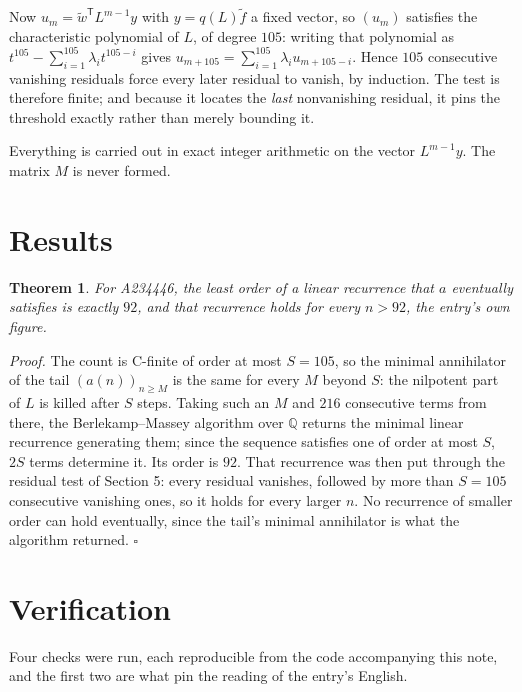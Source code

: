 \documentclass[11pt]{article}
\newtheorem{theorem}{Theorem}
\theoremstyle{definition}
\begin{document}
Now $u_m = \tilde w^{\mathsf T} L^{m-1} y$ with $y = q(L)\tilde f$ a fixed vector, so $(u_m)$ satisfies the characteristic polynomial of $L$, of degree $105$: writing that polynomial as $t^{105} - \sum_{i=1}^{105} \lambda_i t^{105-i}$ gives $u_{m+105} = \sum_{i=1}^{105} \lambda_i u_{m+105-i}$. Hence $105$ consecutive vanishing residuals force every later residual to vanish, by induction. The test is therefore finite; and because it locates the {\itshape last} nonvanishing residual, it pins the threshold exactly rather than merely bounding it.

Everything is carried out in exact integer arithmetic on the vector $L^{m-1}y$. The matrix $M$ is never formed.

\section{Results}

\begin{theorem} For A234446, the least order of a linear recurrence that $a$ eventually satisfies is exactly $92$, and that recurrence holds for every $n > 92$, the entry's own figure.\end{theorem}

{\itshape Proof.} The count is C-finite of order at most $S = 105$, so the minimal annihilator of the tail $(a(n))_{n \ge M}$ is the same for every $M$ beyond $S$: the nilpotent part of $L$ is killed after $S$ steps. Taking such an $M$ and $216$ consecutive terms from there, the Berlekamp--Massey algorithm over $\mathbb{Q}$ returns the minimal linear recurrence generating them; since the sequence satisfies one of order at most $S$, $2S$ terms determine it. Its order is $92$. That recurrence was then put through the residual test of Section 5: every residual vanishes, followed by more than $S = 105$ consecutive vanishing ones, so it holds for every larger $n$. No recurrence of smaller order can hold eventually, since the tail's minimal annihilator is what the algorithm returned. $\square$

\section{Verification}

Four checks were run, each reproducible from the code accompanying this note, and the first two are what pin the reading of the entry's English.
\end{document}
